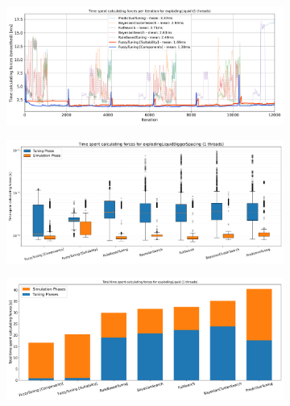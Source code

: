\newpage



\begin{figure}[H]
    \centering

    \begin{subfigure}[c]{\textwidth}
        \includegraphics[width=\columnwidth,trim={0cm 0 0cm 0.9cm},clip]{figures/Benchmark/ExplodingLiquid/timing_explodingLiquid_1.png}
        \caption{}
        \label{fig:explodingTimings_1thread}
    \end{subfigure}


    \begin{subfigure}[c]{\textwidth}
        \includegraphics[width=\columnwidth,trim={0cm 0 0cm 1cm},clip]{figures/Benchmark/ExplodingLiquid/boxplot_explodingLiquid_1.png}
        \caption{}
        \label{fig:explodingLiquidBoxplot_1thread}
    \end{subfigure}

    \begin{subfigure}[b]{\textwidth}
        \includegraphics[width=\columnwidth,trim={0cm 0 0cm 0.9cm},clip]{figures/Benchmark/ExplodingLiquid/total_time_explodingLiquid_1.png}
        \caption{}
        \label{fig:explodingLiquidTotalTime_1thread}
    \end{subfigure}



\end{figure}
